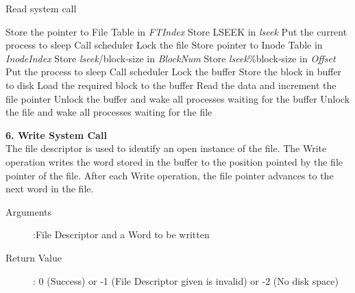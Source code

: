 \documentclass[11pt ,twosided]{article}
\begin{document}
\begin{algorithm}
\caption{Read system call}
\begin{algorithmic}
\ENDIF
{}
\ELSE 
    \STATE Store the pointer to File Table in  \textit{FTIndex}
    \STATE Store LSEEK in \textit{lseek}
\ENDIF
{}
            \STATE Put the current process to sleep
            \STATE Call scheduler
        \ENDWHILE
    \ENDIF
\ENDIF
\STATE Lock the file
\STATE Store pointer to Inode Table in  \textit{InodeIndex}
\ELSE 
    \STATE Store \textit{lseek}/block-size in \textit{BlockNum}
    \STATE Store \textit{lseek}\%block-size in \textit{Offset}
\ENDIF
{}
            \STATE Put the process to sleep 
            \STATE Call scheduler
        \ENDWHILE
    \ENDIF
\ENDIF
\STATE Lock the buffer
        \STATE Store the block in buffer to disk
    \ENDIF
    \STATE Load the required block to the buffer
\ENDIF
\STATE Read the data and increment the file pointer
\STATE Unlock the buffer and wake all processes waiting for the buffer
\STATE Unlock the file and wake all processes waiting for the file
\end{algorithmic}
\end{algorithm}
\vspace{3mm}
\fi
\textbf{6. Write System Call}
\vspace{2mm}\\
The file descriptor is used to identify an open instance of the file. The Write operation writes the word stored in the buffer to the position pointed by the file pointer of the file. After each Write operation, the file pointer advances to the next word in the file.
\begin{description}
	\item[Arguments]:File Descriptor and a Word to be written
	\item[Return Value]: 0 (Success) or -1 (File Descriptor given is invalid) or -2 (No disk space)
\end{description} 
\iffalse
\end{document}
